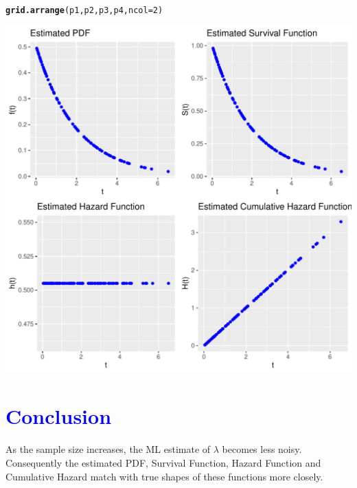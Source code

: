 \documentclass[11pt, a4paper]{article}\usepackage[]{graphicx}\usepackage[]{xcolor}
\makeatletter
\def\maxwidth{ %
  \ifdim\Gin@nat@width>\linewidth
    \linewidth
  \else
    \Gin@nat@width
  \fi
}
\newcommand{\hlnum}[1]{\textcolor[rgb]{0.686,0.059,0.569}{#1}}%
\newcommand{\hldef}[1]{\textcolor[rgb]{0.345,0.345,0.345}{#1}}%
\newcommand{\hlkwc}[1]{\textcolor[rgb]{0.333,0.667,0.333}{#1}}%
\newcommand{\hlkwd}[1]{\textcolor[rgb]{0.737,0.353,0.396}{\textbf{#1}}}%
\newenvironment{kframe}{%
 \def\at@end@of@kframe{}%
 \ifinner\ifhmode%
  \def\at@end@of@kframe{\end{minipage}}%
  \begin{minipage}{\columnwidth}%
 \fi\fi%
 \def\FrameCommand##1{\hskip\@totalleftmargin \hskip-\fboxsep
 \colorbox{shadecolor}{##1}\hskip-\fboxsep
     \hskip-\linewidth \hskip-\@totalleftmargin \hskip\columnwidth}%
 \MakeFramed {\advance\hsize-\width
   \@totalleftmargin\z@ \linewidth\hsize
   \@setminipage}}%
 {\par\unskip\endMakeFramed%
 \at@end@of@kframe}
\newenvironment{knitrout}{}{} %
\makeatother
\begin{document}
\begin{knitrout}
\color{fgcolor}\begin{kframe}
\begin{alltt}
\hlkwd{grid.arrange}\hldef{(p1, p2, p3, p4,} \hlkwc{ncol} \hldef{=} \hlnum{2}\hldef{)}
\end{alltt}
\end{kframe}
\includegraphics[width=\maxwidth]{figure/unnamed-chunk-21-1} 
\end{knitrout}

\section*{\faArrowAltCircleRight[regular] \textcolor{blue}{Conclusion}}

As the sample size increases, the ML estimate of $\lambda$ becomes less noisy. Consequently the estimated PDF, Survival Function, Hazard Function and Cumulative Hazard match with true shapes of these functions more closely.
\end{document}

